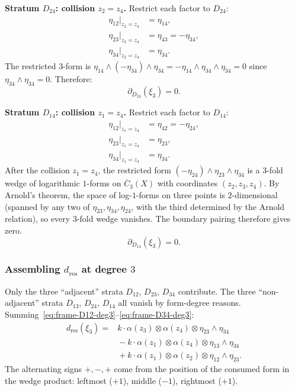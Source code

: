 \medskip
\noindent\textbf{Stratum $D_{24}$: collision $z_2 = z_4$.}
Restrict each factor to $D_{24}$:
\begin{align*}
\eta_{12}\big|_{z_2 = z_4} &= \eta_{14}, \\
\eta_{23}\big|_{z_2 = z_4} &= \eta_{43} = -\eta_{34}, \\
\eta_{34}\big|_{z_2 = z_4} &= \eta_{34}.
\end{align*}
The restricted $3$-form is
$\eta_{14} \wedge (-\eta_{34}) \wedge \eta_{34}
= -\eta_{14} \wedge \eta_{34} \wedge \eta_{34} = 0$
since $\eta_{34} \wedge \eta_{34} = 0$.
Therefore:
\begin{equation}\label{eq:frame-D24-deg3}
\partial_{D_{24}}(\xi_3) = 0.
\end{equation}

\medskip
\noindent\textbf{Stratum $D_{14}$: collision $z_1 = z_4$.}
Restrict each factor to $D_{14}$:
\begin{align*}
\eta_{12}\big|_{z_1 = z_4} &= \eta_{42} = -\eta_{24}, \\
\eta_{23}\big|_{z_1 = z_4} &= \eta_{23}, \\
\eta_{34}\big|_{z_1 = z_4} &= \eta_{34}.
\end{align*}
After the collision $z_1 = z_4$, the restricted form
$(-\eta_{24}) \wedge \eta_{23} \wedge \eta_{34}$ is a $3$-fold wedge of
logarithmic $1$-forms on $\overline{C}_3(X)$ with coordinates
$(z_2, z_3, z_4)$. By Arnold's theorem, the space of log-$1$-forms
on three points is $2$-dimensional (spanned by any two of
$\eta_{23}, \eta_{34}, \eta_{24}$, with the third determined by the
Arnold relation), so every $3$-fold wedge vanishes.
The boundary pairing therefore gives zero.
\begin{equation}\label{eq:frame-D14-deg3}
\partial_{D_{14}}(\xi_3) = 0.
\end{equation}

\subsubsection*{Assembling $d_{\mathrm{res}}$ at degree $3$}

Only the three ``adjacent'' strata $D_{12}$, $D_{23}$, $D_{34}$
contribute. The three ``non-adjacent'' strata $D_{13}$, $D_{24}$,
$D_{14}$ all vanish by form-degree reasons.
Summing~\eqref{eq:frame-D12-deg3}--\eqref{eq:frame-D34-deg3}:
\begin{equation}\label{eq:frame-dres-deg3-full}
\boxed{\begin{aligned}
d_{\mathrm{res}}(\xi_3)
={} & k \cdot \alpha(z_3) \otimes \alpha(z_4)
 \otimes \eta_{23} \wedge \eta_{34} \\
 & {} - k \cdot \alpha(z_1) \otimes \alpha(z_4)
 \otimes \eta_{13} \wedge \eta_{34} \\
 & {} + k \cdot \alpha(z_1) \otimes \alpha(z_2)
 \otimes \eta_{12} \wedge \eta_{23}.
\end{aligned}}
\end{equation}
The alternating signs $+, -, +$ come from the position of the
consumed form in the wedge product: leftmost ($+1$), middle
($-1$), rightmost ($+1$).

